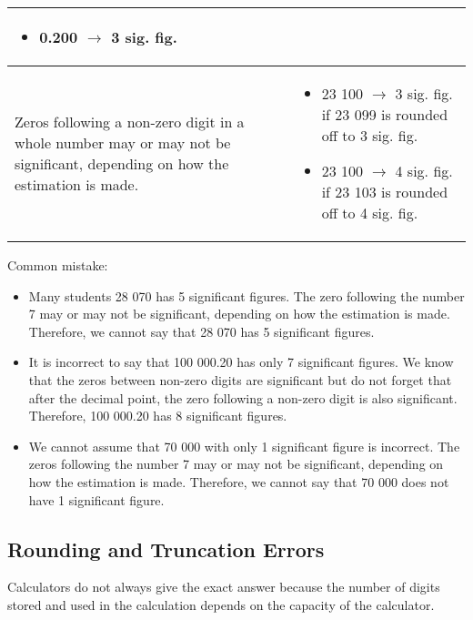 \documentclass[../main]{subfiles}
\begin{document}
\begin{center}
\begin{tabular}{|p{4cm} | p{4cm} |}
\begin{itemize}
                                                                               \item  0.200 \(\rightarrow\) 3 sig. fig.
                                                                               \end{itemize} \\ \hline
    Zeros following a non-zero digit in a whole number may or may not be significant, depending on how the estimation is made.
    &
      \begin{itemize}
      \item  23 100 \(\rightarrow\) 3 sig. fig. if 23 099 is rounded off to 3 sig. fig.
      \item  23 100 \(\rightarrow\) 4 sig. fig. if 23 103 is rounded off to 4 sig. fig.
      \end{itemize} \\ \hline

  \end{tabular}
\end{center}

Common mistake:
\begin{itemize}
\item Many students 28 070 has 5 significant figures. The zero following the number 7 may or
  may not be significant, depending on how the estimation is made. Therefore, we
  cannot say that 28 070 has 5 significant figures.
\item It is incorrect to say that 100 000.20 has only 7 significant figures. We
  know that the zeros between non-zero digits are significant but do not forget
  that after the decimal point, the zero following a non-zero digit is also
  significant. Therefore, 100 000.20 has 8 significant figures.
 
\item We cannot assume that 70 000 with only 1 significant figure is incorrect.
  The zeros following the number 7 may or may not be significant, depending on
  how the estimation is made. Therefore, we cannot say that 70 000 does not have
  1 significant figure. 
\end{itemize}

\subsection{Rounding and Truncation Errors}
Calculators do not always give the exact answer because the number of digits
stored and used in the calculation depends on the capacity of the calculator.
\end{document}
